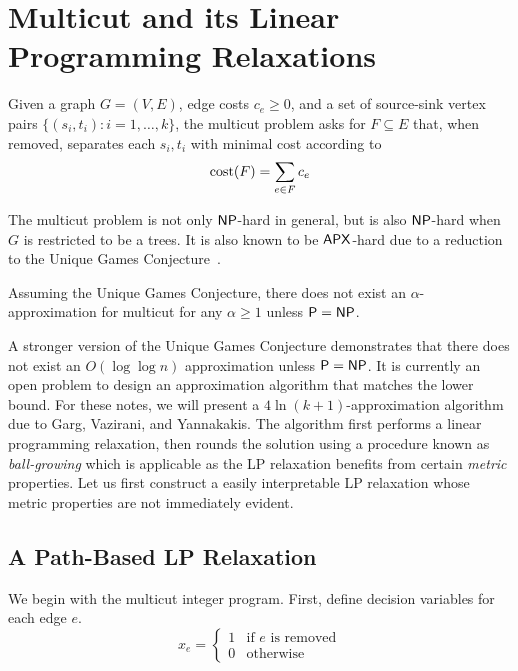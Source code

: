 \section{Multicut and its Linear Programming Relaxations}

Given a graph $G = (V, E)$, edge costs $c_e \geq 0$, and a set of source-sink vertex pairs $\{ (s_i, t_i): i = 1, \ldots, k \}$, the multicut problem asks for $F \subseteq E$ that, when removed, separates each $s_i, t_i$ with minimal cost according to
\begin{equation*}
\textup{cost}(F) = \sum_{e \in F} c_e
\end{equation*}

The multicut problem is not only $\mathsf{NP}$-hard in general, but is also $\mathsf{NP}$-hard when $G$ is restricted to be a trees. It is also known to be $\mathsf{APX}$-hard due to a reduction to the Unique Games Conjecture~\cite{CKKRS06}.

\begin{theorem}
Assuming the Unique Games Conjecture, there does not exist an $\alpha$-approximation for multicut for any $\alpha \geq 1$ unless $\mathsf{P} = \mathsf{NP}$.
\end{theorem}

A stronger version of the Unique Games Conjecture demonstrates that there does not exist an $O(\log \log n)$ approximation unless $\mathsf{P} = \mathsf{NP}$. It is currently an open problem to design an approximation algorithm that matches the lower bound. For these notes, we will present a $4\ln(k+1)$-approximation algorithm due to Garg, Vazirani, and Yannakakis. The algorithm first performs a linear programming relaxation, then rounds the solution using a procedure known as \emph{ball-growing} which is applicable as the LP relaxation benefits from certain \emph{metric} properties. Let us first construct a easily interpretable LP relaxation whose metric properties are not immediately evident.


\subsection{A Path-Based LP Relaxation}

We begin with the multicut integer program. First, define decision variables for each edge $e$.
\begin{equation*}
x_e = \begin{cases}
1 & \text{if }e \text{ is removed} \\
0 & \text{otherwise}
\end{cases}
\end{equation*}

